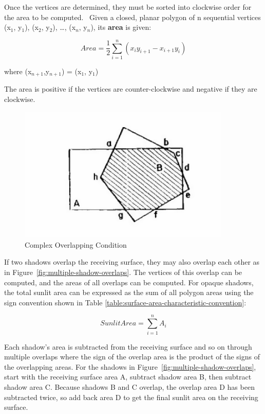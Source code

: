 Once the vertices are determined, they must be sorted into clockwise order for the area to be computed.~ Given a closed, planar polygon of n sequential vertices (x\(_{1}\), y\(_{1}\)), (x\(_{2}\), y\(_{2}\)), \ldots{}, (x\(_{n}\), y\(_{n}\)), its \textbf{area} is given:

\begin{equation}
Area = {\frac{1}{2}}\sum\limits_{i = 1}^n {({x_i}{y_{i + 1}} - {x_{i + 1}}{y_i})}
\end{equation}

where (x\(_{n+1}\),y\(_{n+1}\)) = (x\(_{1}\), y\(_{1}\))

The area is positive if the vertices are counter-clockwise and negative if they are clockwise.

\begin{figure}[hbtp] %
\centering
\includegraphics[width=0.9\textwidth, height=0.9\textheight, keepaspectratio=true]{media/image641.png}
\caption{Complex Overlapping Condition \protect \label{fig:complex-overlapping-condition}}
\end{figure}

If two shadows overlap the receiving surface, they may also overlap each other as in Figure~\ref{fig:multiple-shadow-overlaps}. The vertices of this overlap can be computed, and the areas of all overlaps can be computed. For opaque shadows, the total sunlit area can be expressed as the sum of all polygon areas using the sign convention shown in Table \ref{table:surface-area-characteristic-convention}:

\begin{equation}
SunlitArea = {\sum\limits_{i = 1}^n {A_i}}
\end{equation}

Each shadow's area is subtracted from the receiving surface and so on through multiple overlaps where the sign of the overlap area is the product of the signs of the overlapping areas. For the shadows in Figure~\ref{fig:multiple-shadow-overlaps}, start with the receiving surface area A, subtract shadow area B, then subtract shadow area C. Because shadows B and C overlap, the overlap area D has been subtracted twice, so add back area D to get the final sunlit area on the receiving surface.


